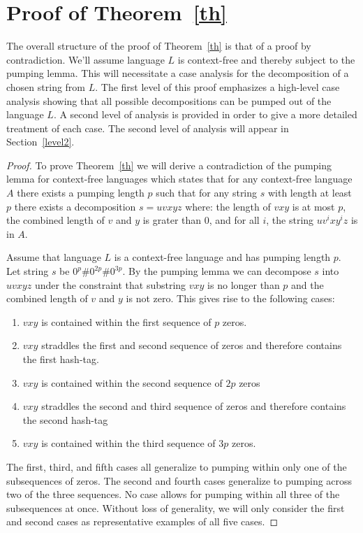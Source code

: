 \documentclass[10pt]{article}
\theoremstyle{definition}
\begin{document}
\section{ Proof of Theorem~\ref{th}}

The overall structure of the proof of Theorem~\ref{th} is that of a proof by contradiction. We'll assume language $L$ is context-free and thereby subject to the pumping lemma. This will necessitate a case analysis for the decomposition of a chosen string from $L$. The first level of this proof emphasizes a high-level case analysis showing that all possible decompositions can be pumped out of the language $L$. A second level of analysis is provided in order to give a more detailed treatment of each case. The second level of analysis will appear in Section~\ref{level2}.

\begin{proof}

To prove Theorem~\ref{th} we will derive a contradiction of the pumping lemma for context-free languages which states that for any context-free language $A$ there exists a pumping length $p$ such that for any string $s$ with length at least $p$ there exists a decomposition $s=uvxyz$ where: the length of $vxy$ is at most $p$, the combined length of $v$ and $y$ is grater than $0$, and for all $i$, the string $uv^{i}xy^{i}z$ is in $A$\cite{Sipser}.

Assume that language $L$ is a context-free language and has pumping length $p$. Let string $s$ be $0^p\#0^{2p}\#0^{3p}$. By the pumping lemma we can decompose $s$ into $uvxyz$ under the constraint that substring $vxy$ is no longer than $p$ and the combined length of $v$ and $y$ is not zero. This gives rise to the following cases:
\begin{enumerate}[ label=\textbf{\roman*.} ]
  \item $vxy$ is contained within the first sequence of $p$ zeros.
  \item $vxy$ straddles the first and second sequence of zeros and therefore contains the first hash-tag.
  \item $vxy$ is contained within the second sequence of $2p$ zeros
  \item $vxy$ straddles the second and third sequence of zeros and therefore contains the second hash-tag
  \item $vxy$ is contained within the third sequence of $3p$ zeros.
\end{enumerate}

The first, third, and fifth cases all generalize to pumping within only one of the subsequences of zeros. The second and fourth cases generalize to pumping across two of the three sequences. No case allows for pumping within all three of the subsequences at once. Without loss of generality, we will only consider the first and second cases as representative examples of all five cases.


\end{proof}
\end{document}
